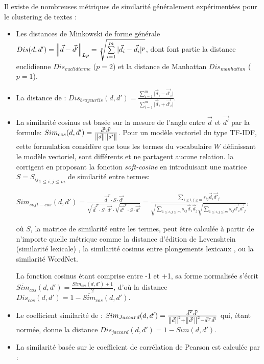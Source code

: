  Il existe de nombreuses métriques de similarité généralement expérimentées pour le clustering de textes \citep{huang2008similarityTextClustering, vijaymeena2016surveySim, afzali2018SimKmeans}:
\begin{itemize}
	\item Les distances de Minkowski de forme générale $Dis(d,d') = \left\lVert\vec{d} - \vec{d'}\right\rVert_{Lp} = \sqrt[p]{\sum\limits_{i=1}^m \vert \vec{d}_i - \vec{d}_i \vert ^p}$, dont font partie la distance euclidienne $Dis_{euclidienne}$ ($p=2$) et la distance de Manhattan $Dis_{manhattan}$ ($p=1$).
	\item La distance de \citet{bray1957distance-braycurtis}: $Dis_{braycurtis}(d,d') = \frac{\sum\limits_{i=1}^m \vert \vec{d}_i - \vec{d'}_i \vert}{\sum\limits_{i=1}^m \vert \vec{d}_i + \vec{d'}_i \vert}$\citep{huang2008similarityTextClustering}.
	\item La similarité cosinus est basée sur la mesure de l'angle entre $\vec{d}$ et $\vec{d'}$ par la formule: $Sim_{cos}(d,d') = \frac{\vec{d}^t\vec{d'}}{\left\lVert\vec{d}\right\rVert\left\lVert\vec{d'}\right\rVert}$.
	Pour un modèle vectoriel du type TF-IDF, cette formulation considère que tous les termes du vocabulaire $W$ définissant le modèle vectoriel, sont différents et ne partagent aucune relation. \citet{sidorov2014softcosine} la corrigent en proposant la fonction \textit{soft-cosine} en introduisant une matrice $S = {S_{ij}}_{1\leq i,j \leq m}$ de similarité entre  termes: 
	
	$Sim_{soft-cos}(d,d')= \frac{{\vec{d}}^T\cdot S\cdot \vec{d'}}{\sqrt{{\vec{d}}^T\cdot S\cdot \vec{d'}}\cdot \sqrt{\vec{d'}^T\cdot S\cdot \vec{d'}}} = \frac{\sum\limits_{1\leq i,j \leq m}s_{ij}\vec{d}_i\vec{d'}_j}{\sqrt{\sum\limits_{1\leq i,j \leq m}s_{ij}\vec{d}_i\vec{d}_j}\sqrt{\sum\limits_{1\leq i,j \leq m}s_{ij}\vec{d'}_i\vec{d'}_j}}$,
	
	où $S$, la matrice de similarité entre les termes, peut être calculée à partir de n'importe quelle métrique comme la distance d'édition de Levenshtein (similarité lexicale) \citep{sidorov2014softcosine},  la similarité cosinus entre  plongements lexicaux \citep{charlet2017simbow_acl, charlet2017simbow_tal}, ou la similarité WordNet.
	
	La fonction cosinus  étant comprise entre -1 et +1, sa forme normalisée s'écrit  $\overline{Sim}_{cos}(d,d') = \frac{Sim_{cos}(d,d') + 1}{2}$, d'où la distance $Dis_{cos}(d,d') = 1 - \overline{Sim}_{cos}(d,d')$.
	
	\item Le coefficient similarité de \cite{jaccard1901similarite-jaccard}: $Sim_{Jaccard}(d,d') = \frac{\vec{d}^T\vec{d'}}{\left\lVert\vec{d}\right\rVert^2+\left\lVert\vec{d'}\right\rVert^2 - \vec{d}^T\vec{d'}}$ \citep{huang2008similarityTextClustering} qui, étant normée, donne la distance $Dis_{jaccard}(d,d') = 1-Sim(d,d')$.
	\item La similarité basée sur le coefficient de corrélation de Pearson est calculée par \citep{huang2008similarityTextClustering}:
	

\end{itemize}
